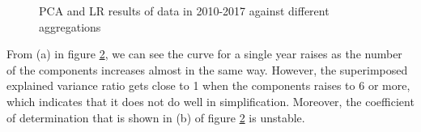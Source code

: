 \documentclass{mcmthesis}
\begin{document}
\begin{figure}[H]
\begin{subfigure}[b]{0.49\textwidth}
        \label{fig:pca_year_score}
    \end{subfigure}
    \caption{PCA and LR results of data in 2010-2017 against different aggregations}\label{fig:pca_year}
\end{figure}

From (a) in figure \ref{fig:pca_year}, we can see the curve for a single year raises as the number of the components increases almost in the same way. However, the superimposed explained variance ratio gets close to 1 when the components raises to 6 or more, which indicates that it does not do well in simplification. Moreover, the coefficient of determination that is shown in (b) of figure \ref{fig:pca_year} is unstable.

~\smallskip
\end{document}

